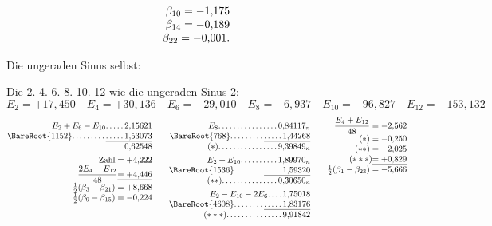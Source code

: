 \begin{landscape}
\[\begin{array}{@{}r@{\qquad}r@{\qquad}r@{}}
\begin{array}[t]{@{}r@{}}
\beta_{10}=-1{,}175\\
\beta_{14}=-0{,}189\\
\beta_{22}=-0{,}001.
\end{array}
\end{array}
\]
\par\noindent\hspace*{\parindent}Die ungeraden Sinus selbst:
\par\noindent\hspace*{\parindent}Die 2. 4. 6. 8. 10. 12 wie die ungeraden Sinus 2:
\[E_2=+17{,}450\quad E_4=+30{,}136\quad E_6=+29{,}010\quad E_8=-6{,}937\quad E_{10}=-96{,}827\quad E_{12}=-153{,}132\]
\[
\begin{array}{@{}r@{\qquad}r@{\qquad}r@{}}
\begin{array}[t]{@{}r@{}}
E_2+E_6-E_{10}\VfourDots{4}2{,}15621\\
\BareRoot{1152}\VfourDots{8}\underline{\VfourDots{4}1{,}53073}\\
0{,}62548\\[4pt]
\text{Zahl}=+4{,}222\\
\dfrac{2E_4-E_{12}}{48}\underline{=+4{,}446}\\
\tfrac12(\beta_3-\beta_{21})=+8{,}668\\
\tfrac12(\beta_9-\beta_{15})=-0{,}224
\end{array}
&\begin{array}[t]{@{}r@{}}
E_8\VfourDots{15}0{,}84117_n\\
\BareRoot{768}\VfourDots{8}\underline{\VfourDots{4}1{,}44268}\\
(*)\VfourDots{15}9{,}39849_n\\[4pt]
E_2+E_{10}\VfourDots{9}1{,}89970_n\\
\BareRoot{1536}\VfourDots{7}\underline{\VfourDots{4}1{,}59320}\\
(**)\VfourDots{14}0{,}30650_n\\[4pt]
E_2-E_{10}-2E_6\VfourDots{3}1{,}75018\\
\BareRoot{4608}\VfourDots{7}\underline{\VfourDots{4}1{,}83176}\\
(***)\VfourDots{14}9{,}91842
\end{array}
&\begin{array}[t]{@{}r@{}}
\dfrac{E_4+E_{12}}{48}=-2{,}562\\
(*)=-0{,}250\\
(**)=-2{,}025\\
(***)\underline{=+0{,}829}\\
\tfrac12(\beta_1-\beta_{23})=-5{,}666\\

\end{array}
\end{array}\]
\end{landscape}

